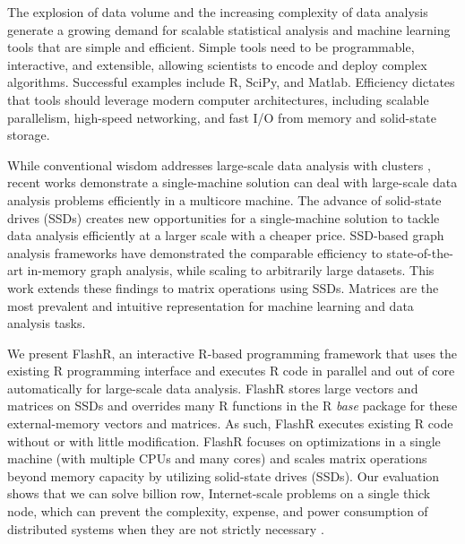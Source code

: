 
The explosion of data volume and the increasing complexity of data analysis
generate a growing demand for scalable statistical analysis and machine
learning tools that are simple and efficient.
Simple tools need to be programmable, interactive, and extensible, 
allowing scientists to encode and deploy complex algorithms. 
Successful examples include R, SciPy, and Matlab.  Efficiency dictates that
tools should leverage modern computer architectures, including scalable parallelism,
high-speed networking, and fast I/O from memory and solid-state storage.

While conventional wisdom addresses large-scale data analysis with clusters
\cite{mapreduce,spark,h2o,systemml,tensorflow,petuum}, recent works
\cite{flashgraph,gridgraph,Matveev17,hotos} demonstrate a single-machine solution
can deal with large-scale data analysis problems efficiently in a multicore
machine. The advance of solid-state drives (SSDs) creates new opportunities
for a single-machine solution to tackle data analysis efficiently at a larger scale
with a cheaper price. SSD-based graph analysis frameworks \cite{flashgraph, gridgraph}
have demonstrated the comparable efficiency to state-of-the-art in-memory graph
analysis, while scaling to arbitrarily large datasets. This work extends
these findings to matrix operations using SSDs. Matrices are the most prevalent
and intuitive representation for machine learning and data analysis tasks.
 


We present FlashR, an interactive R-based programming framework that uses
the existing R programming interface and executes R code in parallel and
out of core automatically for large-scale data analysis. FlashR stores large
vectors and matrices on SSDs and overrides many R functions in the R
\textit{base} package for these external-memory vectors and matrices.
As such, FlashR executes existing R code without or with little modification.
FlashR focuses on optimizations in a single machine (with multiple CPUs and
many cores) and scales matrix operations beyond memory capacity by 
utilizing solid-state drives (SSDs).  
Our evaluation shows that we can solve billion row, Internet-scale 
problems on a single thick node, which can prevent the complexity,
expense, and power consumption of distributed systems when they are
not strictly necessary \cite{hotos}.

